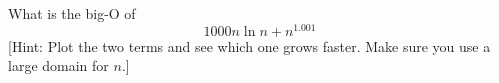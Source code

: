 What is the big-O of 
\[
1000 n \ln n + n^{1.001}
\]
[Hint: Plot the two terms and see which one grows faster.
Make sure you use a large domain for $n$.]
